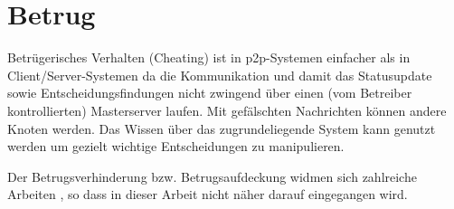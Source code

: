 

\section{Betrug}
Betrügerisches Verhalten (Cheating) ist in p2p-Systemen einfacher als in Client/Server-Systemen da die Kommunikation und damit das Statusupdate sowie Entscheidungsfindungen nicht zwingend über einen (vom Betreiber kontrollierten) Masterserver laufen. Mit gefälschten Nachrichten können andere Knoten werden. Das Wissen über das zugrundeliegende System kann genutzt werden um gezielt wichtige Entscheidungen zu manipulieren.

Der Betrugsverhinderung bzw. Betrugsaufdeckung widmen sich zahlreiche Arbeiten \cite{citeulike:4243521, citeulike:499803, citeulike:3196934, citeulike:4243572, citeulike:6643788}, so dass in dieser Arbeit nicht näher darauf eingegangen wird.
